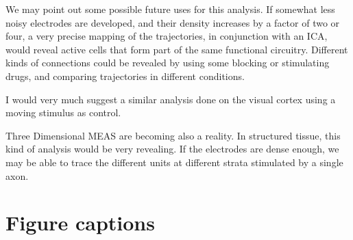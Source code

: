 \documentclass[utf8]{frontiersSCNS}
\begin{document}
We may point out some possible future uses for this analysis.
If somewhat less noisy electrodes are developed, and their density
increases by a factor of two or four, a very precise mapping of the
trajectories, in conjunction with an ICA, would reveal active
cells that form part of the same functional circuitry. Different
kinds of connections could be revealed by using some blocking
or stimulating drugs, and comparing trajectories in different conditions.

I would very much suggest a similar analysis done on
the visual cortex using a moving stimulus as control.

Three Dimensional MEAS are becoming also a reality.
In structured tissue, this kind
of analysis would be very revealing. If the electrodes
are dense enough, we may be able to trace the different units at
different strata stimulated by a single axon.



\section*{Figure captions}





 
\end{document}
